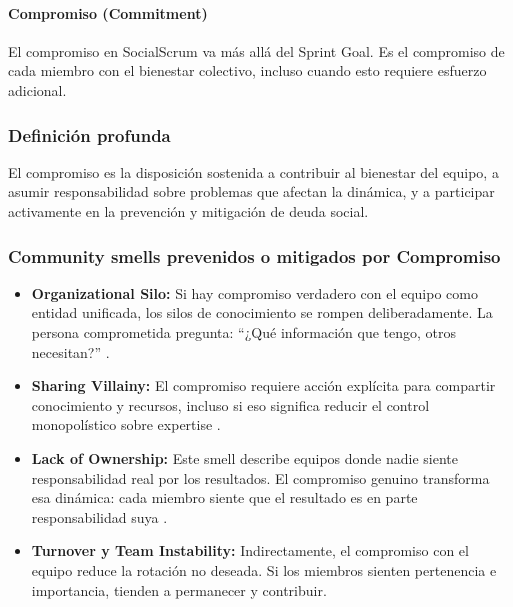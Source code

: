 \paragraph{Compromiso (Commitment)}

El compromiso en SocialScrum va más allá del Sprint Goal. Es el compromiso de cada miembro con el bienestar colectivo, incluso cuando esto requiere esfuerzo adicional.

\subsubsection*{Definición profunda}

El compromiso es la disposición sostenida a contribuir al bienestar del equipo, a asumir responsabilidad sobre problemas que afectan la dinámica, y a participar activamente en la prevención y mitigación de deuda social.

\subsubsection*{Community smells prevenidos o mitigados por Compromiso}

\begin{itemize}

\item \textbf{Organizational Silo:} Si hay compromiso verdadero con el equipo como entidad unificada, los silos de conocimiento se rompen deliberadamente. La persona comprometida pregunta: ``¿Qué información que tengo, otros necesitan?'' \cite{caballero2022communitysmells}.

\item \textbf{Sharing Villainy:} El compromiso requiere acción explícita para compartir conocimiento y recursos, incluso si eso significa reducir el control monopolístico sobre expertise \cite{caballero2022communitysmells}.

\item \textbf{Lack of Ownership:} Este smell describe equipos donde nadie siente responsabilidad real por los resultados. El compromiso genuino transforma esa dinámica: cada miembro siente que el resultado es en parte responsabilidad suya \cite{saeeda2024nontechnicaldebt}.

\item \textbf{Turnover y Team Instability:} Indirectamente, el compromiso con el equipo reduce la rotación no deseada. Si los miembros sienten pertenencia e importancia, tienden a permanecer y contribuir.

\end{itemize}

